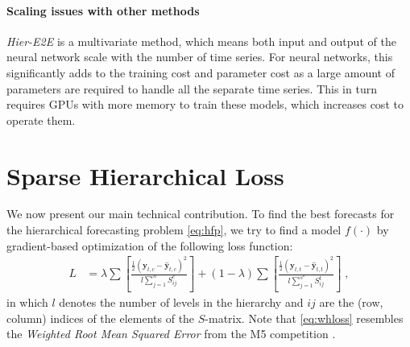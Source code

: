 \documentclass[preprint, 3p, times, twocolumn]{elsarticle}
\begin{document}
\paragraph{Scaling issues with other methods} \label{sec:scalingissuesneuralmethods} \textit{Hier-E2E} \cite{rangapuram_endtoend_2021} is a multivariate method, which means both input and output of the neural network scale with the number of time series. For neural networks, this significantly adds to the training cost and parameter cost as a large amount of parameters are required to handle all the separate time series. This in turn requires GPUs with more memory to train these models, which increases cost to operate them. 

\section{Sparse Hierarchical Loss} \label{sec:sparsehloss}
We now present our main technical contribution. To find the best forecasts for the hierarchical forecasting problem \eqref{eq:hfp}, we try to find a model \(f(\cdot)\) by gradient-based optimization of the following loss function:
\begin{align} \label{eq:whloss}
  L &= \lambda \sum \left[ \frac{\frac{1}{2}(\textbf{y}_{t, c} - \hat{\textbf{y}}_{t, c})^2}{l \sum_{j=1}^n S^c_{ij}} \right] + (1 - \lambda) \sum \left[ \frac{\frac{1}{2}(\textbf{y}_{t, t} - \hat{\textbf{y}}_{t, t})^2}{l \sum_{j=1}^{s^n} S^t_{ij}} \right] \; ,
\end{align}
in which \(l\) denotes the number of levels in the hierarchy and \(ij\) are the (row, column) indices of the elements of the \(S\)-matrix. Note that \eqref{eq:whloss} resembles the \textit{Weighted Root Mean Squared Error} from the M5 competition \cite{makridakis_m5_2022}.
\end{document}
